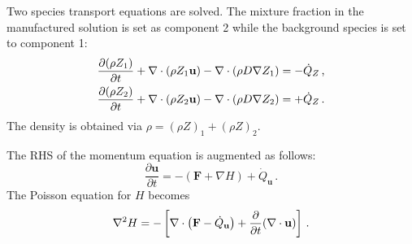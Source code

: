 \documentclass[11pt]{book}
\begin{document}
Two species transport equations are solved.  The mixture fraction in the manufactured solution is set as component 2 while the background species is set to component 1:
\begin{align}
\label{eqn_fds_species_1} \frac{\partial (\rho Z_1)}{\partial t} + \nabla\cdot(\rho Z_1 \mathbf{u}) - \nabla\cdot\left(\rho D \nabla Z_1\right) &= - \dot{Q}_Z \,\mbox{,}\\
\label{eqn_fds_species_2} \frac{\partial (\rho Z_2)}{\partial t} + \nabla\cdot(\rho Z_2 \mathbf{u}) - \nabla\cdot\left(\rho D \nabla Z_2\right) &= + \dot{Q}_Z \,\mbox{.}
\end{align}
The density is obtained via $\rho = (\rho Z)_1 + (\rho Z)_2$.


The RHS of the momentum equation is augmented as follows:
\begin{equation}
\label{eqn_mms_u_eqn}
\frac{\partial \mathbf{u}}{\partial t} = - ( \mathbf{F} + \nabla H ) + \dot{Q}_{\mathbf{u}} \,\mbox{.}
\end{equation}
The Poisson equation for $H$ becomes
\begin{align}
\label{eqn_poisson_mms}
\nabla^2 H = - \left[ \nabla\cdot \left( \mathbf{F} - \dot{Q}_{\mathbf{u}} \right) + \frac{\partial}{\partial t} (\nabla\cdot\mathbf{u}) \right] \,\mbox{.}
\end{align}

\end{document}
